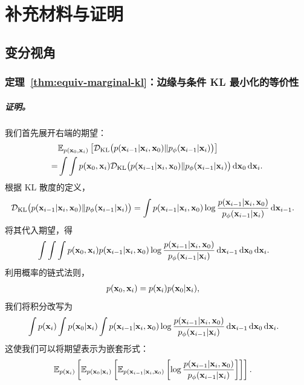 \chapter{补充材料与证明}\label{app:proof}
\section{变分视角}\label{app-sec:var-proof}


\subsection{定理~\ref{thm:equiv-marginal-kl}：边缘与条件 KL 最小化的等价性}\label{subsec:proof-equiv-marginal-kl}
\paragraph{\textit{证明。}} 

我们首先展开右端的期望：
\begin{align*}
    &\mathbb{E}_{p({\mathbf{x}}_0, {\mathbf{x}}_i)}\left[
    \mathcal{D}_{\text{KL}} \big(p({\mathbf{x}}_{i-1}|{\mathbf{x}}_i, {\mathbf{x}}_0) \| p_\phi({\mathbf{x}}_{i-1}|{\mathbf{x}}_i)\big)
    \right]
    \\
    =& \int \int p({\mathbf{x}}_0, {\mathbf{x}}_i)   
    \mathcal{D}_{\text{KL}} \big(p({\mathbf{x}}_{i-1}|{\mathbf{x}}_i, {\mathbf{x}}_0) \| p_\phi({\mathbf{x}}_{i-1}|{\mathbf{x}}_i)\big) 
    \mathop{}\!\mathrm{d}{\mathbf{x}}_0 \mathop{}\!\mathrm{d}{\mathbf{x}}_i.
\end{align*}
根据 KL 散度的定义，
\begin{align*}
    &\mathcal{D}_{\text{KL}} \big(p({\mathbf{x}}_{i-1}|{\mathbf{x}}_i, {\mathbf{x}}_0) \| p_\phi({\mathbf{x}}_{i-1}|{\mathbf{x}}_i)\big)
    = \int p({\mathbf{x}}_{i-1}|{\mathbf{x}}_i, {\mathbf{x}}_0) 
    \log \frac{p({\mathbf{x}}_{i-1}|{\mathbf{x}}_i, {\mathbf{x}}_0)}{p_\phi({\mathbf{x}}_{i-1}|{\mathbf{x}}_i)} 
    \mathop{}\!\mathrm{d}{\mathbf{x}}_{i-1}.
\end{align*}
将其代入期望，得
\begin{align*}
    &\int \int \int p({\mathbf{x}}_0, {\mathbf{x}}_i)  p({\mathbf{x}}_{i-1}|{\mathbf{x}}_i, {\mathbf{x}}_0) 
    \log \frac{p({\mathbf{x}}_{i-1}|{\mathbf{x}}_i, {\mathbf{x}}_0)}{p_\phi({\mathbf{x}}_{i-1}|{\mathbf{x}}_i)} 
    \mathop{}\!\mathrm{d}{\mathbf{x}}_{i-1} \mathop{}\!\mathrm{d}{\mathbf{x}}_0 \mathop{}\!\mathrm{d}{\mathbf{x}}_i.
\end{align*}
利用概率的链式法则，
\begin{align*}
    p({\mathbf{x}}_0, {\mathbf{x}}_i) 
    &= p({\mathbf{x}}_i)   p({\mathbf{x}}_0|{\mathbf{x}}_i),
\end{align*}
我们将积分改写为
\begin{align*}
    &\int p({\mathbf{x}}_i) \int p({\mathbf{x}}_0|{\mathbf{x}}_i) \int p({\mathbf{x}}_{i-1}|{\mathbf{x}}_i, {\mathbf{x}}_0)
    \log \frac{p({\mathbf{x}}_{i-1}|{\mathbf{x}}_i, {\mathbf{x}}_0)}{p_\phi({\mathbf{x}}_{i-1}|{\mathbf{x}}_i)} 
    \mathop{}\!\mathrm{d}{\mathbf{x}}_{i-1} \mathop{}\!\mathrm{d}{\mathbf{x}}_0 \mathop{}\!\mathrm{d}{\mathbf{x}}_i.
\end{align*}
这使我们可以将期望表示为嵌套形式：
\begin{align*}
    &\mathbb{E}_{p({\mathbf{x}}_i)} \left[
    \mathbb{E}_{p({\mathbf{x}}_0|{\mathbf{x}}_i)} \left[
    \mathbb{E}_{p({\mathbf{x}}_{i-1}|{\mathbf{x}}_i, {\mathbf{x}}_0)} \left[
    \log \frac{p({\mathbf{x}}_{i-1}|{\mathbf{x}}_i, {\mathbf{x}}_0)}{p_\phi({\mathbf{x}}_{i-1}|{\mathbf{x}}_i)}
    \right]
    \right]
    \right].
\end{align*}

